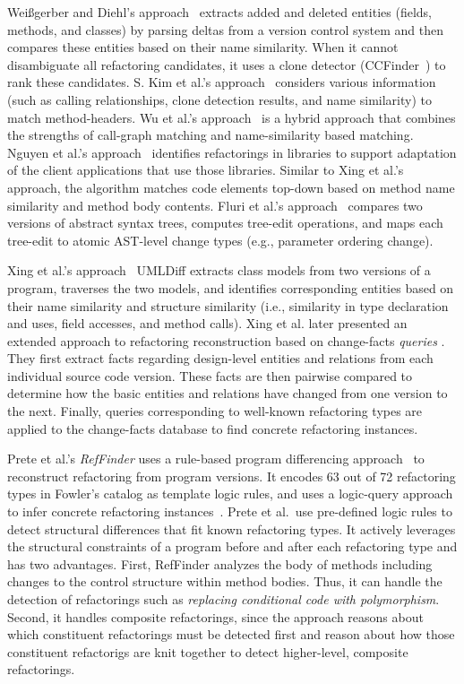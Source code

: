 \documentclass[runningheads,a4paper]{llncs}
\begin{document}
Wei{\ss}gerber and Diehl's approach~\cite{Weissgerber2006} extracts added and deleted entities (fields, methods, and classes) by parsing deltas from a version control system and then compares these entities based on their {name similarity}. When it cannot disambiguate all refactoring candidates, it uses a {clone detector} (CCFinder~\cite{Kamiya2002}) to rank these candidates. S. Kim et al.'s approach~\cite{SKim2005} considers various information (such as {calling relationships}, {clone detection} results, and {name similarity}) to match method-headers.  Wu et al.'s approach~\cite{Wu2010:AHA} is a hybrid approach that combines the strengths of {call-graph matching} and {name-similarity} based matching. Nguyen et al.'s approach~\cite{Nguyen2010:GAA} identifies refactorings in libraries to support adaptation of the client applications that use those libraries. Similar to Xing et al.'s approach, the algorithm matches code elements top-down based on method name similarity and method body contents. Fluri et al.'s approach~\cite{FWP2007} compares two versions of abstract syntax trees, computes tree-edit operations, and maps each tree-edit to atomic AST-level change types (e.g., parameter ordering change).

Xing et al.'s approach~\cite{UMLDiff2005} UMLDiff extracts class models from two versions of a program, traverses the two models, and identifies corresponding entities based on their {name similarity} and {structure similarity} {(i.e., similarity in type declaration and uses, field accesses, and method calls)}.
Xing {et al.} later presented an extended approach to refactoring reconstruction based on change-facts {\em queries} \cite{Eleni01}. They first extract facts regarding design-level entities and relations from each individual source code version. These facts are then pairwise compared to determine how the basic entities and relations have changed from one version to the next. Finally, queries corresponding to well-known refactoring types are applied to the change-facts database to find concrete refactoring instances.

Prete et al.'s {\em RefFinder} uses a rule-based program differencing approach~\cite{Prete2010:reffinder,Kim2010:reffinder} to reconstruct refactoring from program versions. It encodes 63 out of 72 refactoring types in Fowler's catalog as template logic rules, and uses a logic-query approach to infer concrete refactoring instances~\cite{Prete2010:reffinder}. Prete et al.~use pre-defined logic rules to detect structural differences that fit known refactoring types. It actively leverages the structural constraints of a program before and after each refactoring type and has two advantages. First, RefFinder analyzes the body of methods including changes to the control structure within method bodies. Thus, it can handle the detection of refactorings such as {\it replacing conditional code with polymorphism}. Second, it handles composite refactorings, since the approach reasons about which constituent refactorings must be detected first and reason about how those constituent refactorigs are knit together to detect higher-level, composite refactorings.
\end{document}

